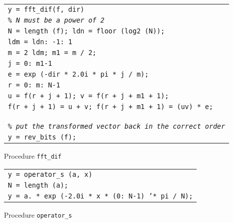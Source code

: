 \begin{listing} \begin{footnotesize}
 
 
\noindent
{\upshape
\begin{tabular}{l} \texttt{\pfunction y = fft\_dif(f, dir)} \\
\texttt{\textit{\% N must be a power of 2}} \\
\texttt{N = length (f); ldn = floor (log2 (N));} \\
\texttt{\pfor ldm = ldn: -1: 1} \\
\quad \texttt{m = 2{\hatverb} ldm; m1 = m / 2;} \\
\quad \texttt{\pfor j = 0: m1-1} \\
\quad \quad \texttt{e = exp (-dir * 2.0i * pi * j / m);} \\
\quad \quad \texttt{\pfor r = 0: m: N-1} \\
\quad \quad \quad \texttt{u = f(r + j + 1); v = f(r + j + m1 + 1);} \\
\quad \quad \quad \texttt{f(r + j + 1) = u + v; f(r + j + m1 + 1) = (uv) * e;} \\
\quad \quad \texttt{\pend} \\
\quad \texttt{\pend} \\
\texttt{\pend} \\
\texttt{\textit{\% put the transformed vector back in the correct order}} \\
\texttt{y = rev\_bits (f);} \\
\end{tabular}
}
 
\noindent \end{footnotesize}
 
\caption{Procedure \texttt{\upshape fft\_dif}}
 
\label{listing-fft_dif}
\end{listing}
 
\begin{listing} \begin{footnotesize}
 
 
\noindent
{\upshape
\begin{tabular}{l} \texttt{\pfunction y = operator\_s (a, x)} \\
\texttt{N = length (a);} \\
\texttt{y = a. * exp (-2.0i * x * (0: N-1) '* pi / N);} \\
\end{tabular}
}
 
\noindent \end{footnotesize}
 
\caption{Procedure \texttt{\upshape operator\_s}}
 
\label{listing-operator_s}
\end{listing}
 
